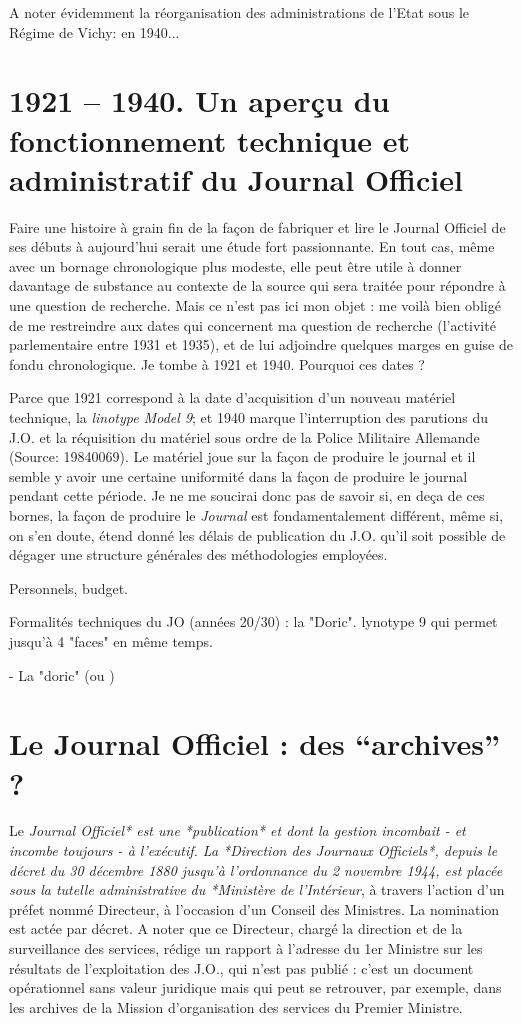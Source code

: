 A noter évidemment la réorganisation des administrations de l'Etat sous le Régime de Vichy: en 1940...

\section{1921 -- 1940. Un aperçu du fonctionnement technique et administratif du Journal Officiel}

Faire une histoire à grain fin de la façon de fabriquer et lire le Journal Officiel de ses débuts à aujourd'hui serait une étude fort passionnante. En tout cas, même avec un bornage chronologique plus modeste, elle peut être utile à donner davantage de substance au contexte de la source qui sera traitée pour répondre à une question de recherche. Mais ce n'est pas ici mon objet : me voilà bien obligé de me restreindre aux dates qui concernent ma question de recherche (l'activité parlementaire entre 1931 et 1935), et de lui adjoindre quelques marges en guise de fondu chronologique. Je tombe à 1921 et 1940. Pourquoi ces dates ?

Parce que 1921 correspond à la date d'acquisition d'un nouveau matériel technique, la \textit{linotype Model 9}; et 1940 marque l'interruption des parutions du J.O. et la réquisition du matériel sous ordre de la Police Militaire Allemande (Source: 19840069). Le matériel joue sur la façon de produire le journal et il semble y avoir une certaine uniformité dans la façon de produire le journal pendant cette période. Je ne me soucirai donc pas de savoir si, en deça de ces bornes, la façon de produire le \textit{Journal} est fondamentalement différent, même si, on s'en doute, étend donné les délais de publication du J.O. qu'il soit possible de dégager une structure générales des méthodologies employées.

Personnels, budget.

Formalités techniques du JO (années 20/30) : la "Doric". lynotype 9 qui permet jusqu'à 4 "faces" en même temps.

- La "doric" (ou )

\section{Le Journal Officiel : des \enquote{archives} ?}

Le \textit{Journal Officiel* est une *publication* et dont la gestion incombait - et incombe toujours - à l'exécutif. La *Direction des Journaux Officiels*, depuis le décret du 30 décembre 1880 jusqu'à l'ordonnance du 2 novembre 1944, est placée sous la tutelle administrative du *Ministère de l'Intérieur}, à travers l'action d'un préfet nommé Directeur, à l'occasion d'un Conseil des Ministres. La nomination est actée par décret. A noter que ce Directeur, chargé la direction et de la surveillance des services, rédige un rapport à l'adresse du 1er Ministre sur les résultats de l'exploitation des J.O., qui n'est pas publié : c'est un document opérationnel sans valeur juridique mais qui peut se retrouver, par exemple, dans les archives de la Mission d'organisation des services du Premier Ministre.

